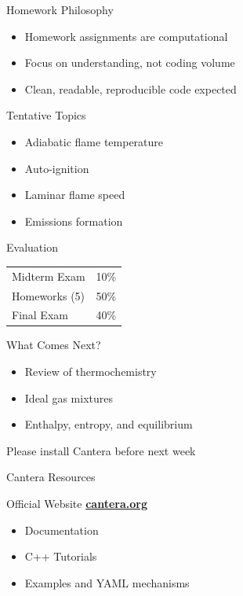 \documentclass[aspectratio=169]{beamer}
\begin{document}
\begin{frame}{Homework Philosophy}
\begin{itemize}
  \item Homework assignments are computational
  \item Focus on understanding, not coding volume
  \item Clean, readable, reproducible code expected
\end{itemize}

\vspace{0.3cm}

\begin{block}{Tentative Topics}
\begin{itemize}
  \item Adiabatic flame temperature
  \item Auto-ignition
  \item Laminar flame speed
  \item Emissions formation
\end{itemize}
\end{block}
\end{frame}

\begin{frame}{Evaluation}
\begin{center}
\begin{tabular}{l c}
Midterm Exam & 10\% \\
Homeworks (5) & 50\% \\
Final Exam & 40\%
\end{tabular}
\end{center}
\end{frame}

\begin{frame}{What Comes Next?}
\begin{itemize}
  \item Review of thermochemistry
  \item Ideal gas mixtures
  \item Enthalpy, entropy, and equilibrium
\end{itemize}

\vspace{0.5cm}

\centering
\alert{Please install Cantera before next week}
\end{frame}

\begin{frame}{Cantera Resources}

\begin{block}{Official Website}
\centering
\Large
\href{https://cantera.org}{\textbf{cantera.org}}
\end{block}

\vspace{0.4cm}

\begin{itemize}
  \item Documentation
  \item C++ Tutorials
  \item Examples and YAML mechanisms
\end{itemize}

\end{frame}
\end{document}
